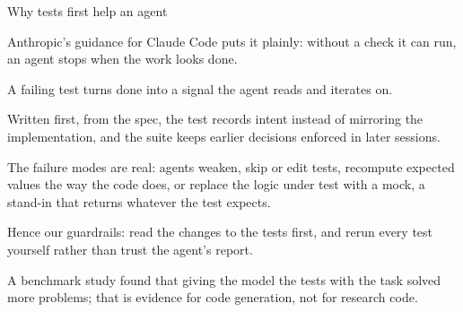 \begin{frame}[source={Anthropic (2026), Claude Code best practices · Mathews \& Nagappan (2024), ASE ’24}]{Why tests first help an agent}
{    Anthropic's guidance for Claude Code puts it plainly: without a check it can run, an agent
      stops when the work looks done.\par
    A failing test turns done into a signal the agent reads and iterates on.\par
    Written first, from the spec, the test records intent instead of mirroring the
      implementation, and the suite keeps earlier decisions enforced in later sessions.\par
    The failure modes are real: agents weaken, skip or edit tests, recompute expected values the
      way the code does, or replace the logic under test with a mock, a stand-in that returns
      whatever the test expects.\par
    Hence our guardrails: read the changes to the tests first, and rerun every test yourself
      rather than trust the agent's report.\par
    A benchmark study found that giving the model the tests with the task solved more problems;
      that is evidence for code generation, not for research code.}
\end{frame}
